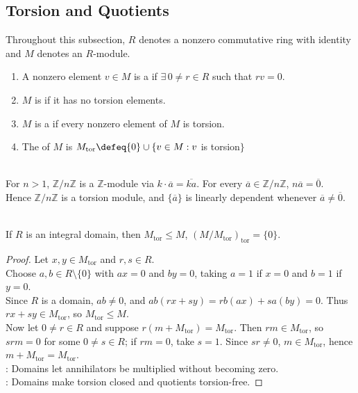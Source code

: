 \subsection{Torsion and Quotients}

Throughout this subsection, $R$ denotes a nonzero commutative ring with identity and $M$ denotes an $R$-module.

\begin{definition} \label{def:module-torsion} 
\begin{enumerate}[label=(\roman*)]
\setlength{\itemsep}{0pt}
\item A nonzero element $v\in M$ is a  if $\exists\,0\neq r\in R$ such that $rv=0$.
\item $M$ is  if it has no torsion elements.
\item $M$ is a  if every nonzero element of $M$ is torsion.
\item The  of $M$ is $M_{\operatorname{tor}}\defeq\{0\}\cup\{v\in M:v$ is torsion$\}$
\end{enumerate}
\end{definition}

\begin{example} \label{ex:zn-is-torsion-module} \\
For $n>1$, $\mathbb{Z}/n\mathbb{Z}$ is a $\mathbb{Z}$-module via $k\cdot \overline{a}=\overline{ka}$. For every $\overline{a}\in\mathbb{Z}/n\mathbb{Z}$, $n\overline{a}=\overline{0}$.\\
Hence $\mathbb{Z}/n\mathbb{Z}$ is a torsion module, and $\{\overline{a}\}$ is linearly dependent whenever $\overline{a}\neq\overline{0}$.
\end{example}

\begin{proposition} \label{prop:torsion-submodule-over-domain} \\
If $R$ is an integral domain, then $M_{\operatorname{tor}}\leq M$, $(M/M_{\operatorname{tor}})_{\operatorname{tor}}=\{0\}$.
\begin{proof}
Let $x,y\in M_{\operatorname{tor}}$ and $r,s\in R$.\\
Choose $a,b\in R\setminus\{0\}$ with $ax=0$ and $by=0$, taking $a=1$ if $x=0$ and $b=1$ if $y=0$.\\
Since $R$ is a domain, $ab\neq0$, and $ab(rx+sy)=rb(ax)+sa(by)=0$. Thus $rx+sy\in M_{\operatorname{tor}}$, so $M_{\operatorname{tor}}\leq M$.\\
Now let $0\neq r\in R$ and suppose $r(m+M_{\operatorname{tor}})=M_{\operatorname{tor}}$. Then $rm\in M_{\operatorname{tor}}$, so $srm=0$ for some $0\neq s\in R$; if $rm=0$, take $s=1$. Since $sr\neq0$, $m\in M_{\operatorname{tor}}$, hence $m+M_{\operatorname{tor}}=M_{\operatorname{tor}}$.\\
: Domains let annihilators be multiplied without becoming zero.\\
: Domains make torsion closed and quotients torsion-free.
\end{proof}
\end{proposition}

